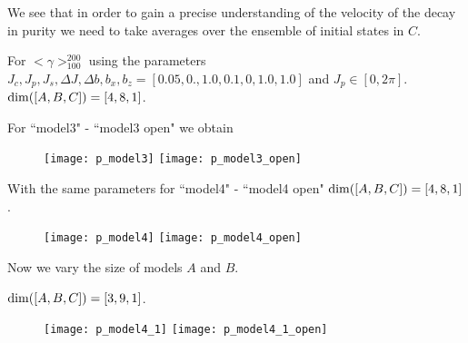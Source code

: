 \documentclass[floatfix]{article}
\newcommand*{\ud}{
\underline{\space\space}}
\begin{document}
We see that in order to gain a precise understanding of the velocity of the decay in purity we need to take averages
over the ensemble of initial states in $C$.

For $<\gamma>_{100}^{200}$ using the parameters $J_c,J_p,J_s,\Delta J,\Delta b,b_x,b_z=[0.05,0.,1.0,0.1,0,1.0,1.0] $ 
and $J_p \in [0,2\pi]$. ${\rm dim}([A,B,C])=[4,8,1]$.


For ``model3" - ``model3\ud open" we obtain

\begin{figure}[H]
\begin{center}
\texttt{[image: p\_model3]}  
\texttt{[image: p\_model3\_open]}  
\end{center}
\caption{}
\label{p_m3}
\end{figure}




With the same parameters for ``model4" - ``model4\ud open"
${\rm dim}([A,B,C])=[4,8,1]$.

\begin{figure}[H]
\begin{center}
\texttt{[image: p\_model4]}  
\texttt{[image: p\_model4\_open]}  
\end{center}
\caption{}
\label{p_m4}
\end{figure}

Now we vary the size of models $A$ and $B$.


% 
% 
% 

${\rm dim}([A,B,C])=[3,9,1]$.

\begin{figure}[H]
\begin{center}
\texttt{[image: p\_model4\_1]}  
\texttt{[image: p\_model4\_1\_open]}  
\end{center}
\caption{}
\label{p_m4}
\end{figure}
\end{document}
